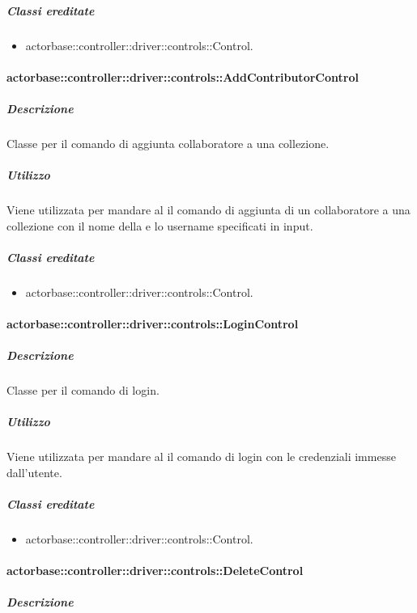 \documentclass{scalatekids-article}
\begin{document}
\subparagraph{Classi ereditate}

\begin{itemize}
\item actorbase::controller::driver::controls::Control.
\end{itemize}

\paragraph{actorbase::controller::driver::controls::AddContributorControl}

\subparagraph{Descrizione}

Classe per il comando di aggiunta collaboratore a una collezione.

\subparagraph{Utilizzo}

Viene utilizzata per mandare al  il comando di aggiunta di un
collaboratore a una collezione con il nome della  e lo
username specificati in input.

\subparagraph{Classi ereditate}

\begin{itemize}
\item actorbase::controller::driver::controls::Control.
\end{itemize}

\paragraph{actorbase::controller::driver::controls::LoginControl}

\subparagraph{Descrizione}

Classe per il comando di login.

\subparagraph{Utilizzo}

Viene utilizzata per mandare al  il comando di login con le
credenziali immesse dall'utente.

\subparagraph{Classi ereditate}

\begin{itemize}
\item actorbase::controller::driver::controls::Control.
\end{itemize}

\paragraph{actorbase::controller::driver::controls::DeleteControl}

\subparagraph{Descrizione}
\end{document}
